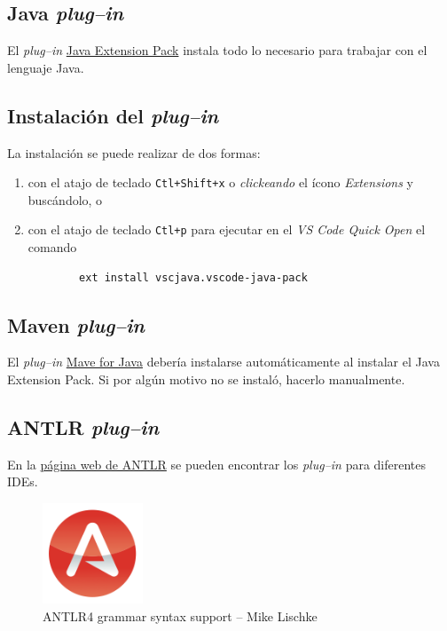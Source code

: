 \documentclass[a5paper,10pt]{article}
\begin{document}
\subsection{Java \emph{plug--in}}
\label{pluginJava}

El \emph{plug--in} \href{https://marketplace.visualstudio.com/items?itemName=vscjava.vscode-java-pack}{Java Extension Pack} instala todo lo necesario para trabajar con el lenguaje Java.

\subsection*{Instalación del \emph{plug--in}}
\label{instalacionJava}

La instalación se puede realizar de dos formas:
\begin{enumerate}
	\item con el atajo de teclado \verb|Ctl+Shift+x| o \emph{clickeando} el ícono \emph{Extensions} y buscándolo, o
    \item con el atajo de teclado \verb|Ctl+p| para ejecutar en el \emph{VS Code Quick Open} el comando
    \begin{verbatim}
		ext install vscjava.vscode-java-pack
	\end{verbatim}
\end{enumerate}


\subsection{Maven \emph{plug--in}}
\label{pluginMaven}

El \emph{plug--in} \href{https://marketplace.visualstudio.com/items?itemName=vscjava.vscode-maven}{Mave for Java} debería instalarse automáticamente al instalar el Java Extension Pack.  Si por algún motivo no se instaló, hacerlo manualmente.


\subsection{ANTLR \emph{plug--in}}
\label{pluginANTLR}

En la \href{https://www.antlr.org/tools.html}{página web de ANTLR} se pueden encontrar los \emph{plug--in} para diferentes IDEs.

\begin{figure}[b]
	\centering
	\includegraphics[width=3cm]{img/IconoANTLRvscode}
	\caption{ANTLR4 grammar syntax support -- Mike Lischke}
	\label{icono}
\end{figure}
\end{document}
